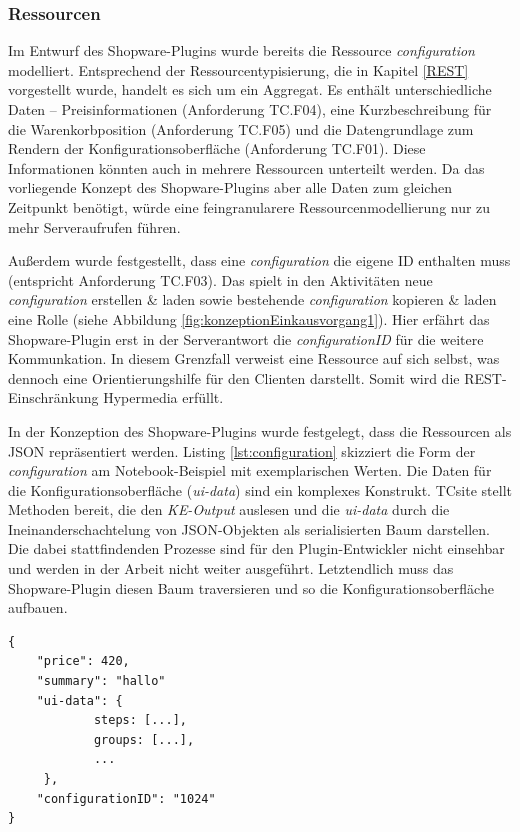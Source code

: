 \documentclass[11pt, a4paper, titlepage, listof=totoc, bibliography=totoc, index=totoc, twoside, openright, headings=normal]{scrreprt}
\begin{document}
\subsubsection{Ressourcen}
Im Entwurf des Shopware-Plugins wurde bereits die Ressource \emph{configuration} modelliert. Entsprechend der Ressourcentypisierung, die in Kapitel \ref{REST} vorgestellt wurde, handelt es sich um ein Aggregat. Es enthält unterschiedliche Daten -- Preisinformationen (Anforderung TC.F04), eine Kurzbeschreibung für die Warenkorbposition (Anforderung TC.F05) und die Datengrundlage zum Rendern der Konfigurationsoberfläche (Anforderung TC.F01). Diese Informationen könnten auch in mehrere Ressourcen unterteilt werden. Da das vorliegende Konzept des Shopware-Plugins aber alle Daten zum gleichen Zeitpunkt benötigt, würde eine feingranularere Ressourcenmodellierung nur zu mehr Serveraufrufen führen.

Außerdem wurde festgestellt, dass eine \emph{configuration} die eigene ID enthalten muss (entspricht Anforderung TC.F03). Das spielt in den Aktivitäten \glqq neue \emph{configuration} erstellen \& laden\grqq{}  sowie \glqq bestehende \emph{configuration} kopieren \& laden\grqq{} eine Rolle (siehe Abbildung \ref{fig:konzeptionEinkausvorgang1}). Hier erfährt das Shopware-Plugin erst in der Serverantwort die \emph{configurationID} für die weitere Kommunkation. In diesem Grenzfall verweist eine Ressource auf sich selbst, was dennoch eine Orientierungshilfe für den Clienten darstellt. Somit wird die REST-Einschränkung \glqq Hypermedia\grqq{} erfüllt.

In der Konzeption des Shopware-Plugins wurde festgelegt, dass die Ressourcen als JSON repräsentiert werden. Listing \ref{lst:configuration} skizziert die Form der \emph{configuration} am Notebook-Beispiel mit exemplarischen Werten. Die Daten für die Konfigurationsoberfläche (\emph{ui-data}) sind ein komplexes Konstrukt. TCsite stellt Methoden bereit, die den \emph{KE-Output} auslesen und die \emph{ui-data} durch die Ineinanderschachtelung von JSON-Objekten als serialisierten Baum darstellen. Die dabei stattfindenden Prozesse sind für den Plugin-Entwickler nicht einsehbar und werden in der Arbeit nicht weiter ausgeführt. Letztendlich muss das Shopware-Plugin diesen Baum traversieren und so die Konfigurationsoberfläche aufbauen.

\vspace{1em}
\begin{lstlisting}[caption=Beispiel einer \emph{configuration}, label=lst:configuration]
{
	"price": 420,
	"summary": "hallo"
	"ui-data": {
			steps: [...],
			groups: [...],
			...
	 },
	"configurationID": "1024"
}
\end{lstlisting}
\end{document}
